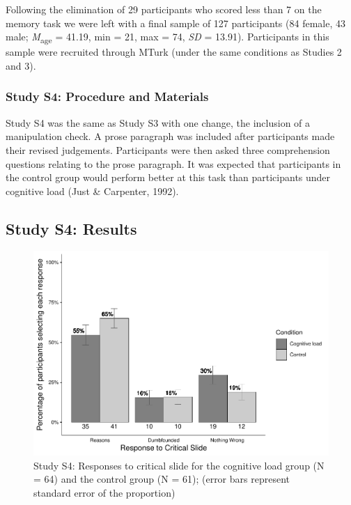 \documentclass[
  man,floatsintext]{apa6}
\begin{document}
Following the elimination of 29 participants who scored less than 7 on the memory task we were left with a final sample of 127 participants (84 female, 43 male; \emph{M}\textsubscript{age} = 41.19, min = 21, max = 74, \emph{SD} = 13.91). Participants in this sample were recruited through
MTurk (under the same conditions as Studies 2 and 3).

\hypertarget{study-s4-procedure-and-materials}{%
\subsubsection{Study S4: Procedure and Materials}\label{study-s4-procedure-and-materials}}

Study S4 was the same as Study S3 with one change, the inclusion of a manipulation check. A prose paragraph was included after participants made their revised judgements. Participants were then asked three comprehension questions relating to the prose paragraph. It was expected that participants in the control group would perform better at this task than participants under cognitive load (Just \& Carpenter, 1992).

\hypertarget{study-s4-results}{%
\subsection{Study S4: Results}\label{study-s4-results}}

\begin{figure}[!h]
\includegraphics{Supplementary_files/figure-latex/ch5S4fig2criticalcondition-1} \caption{Study S4: Responses to critical slide for the cognitive load group (N = 64) and the control group (N = 61); (error bars represent standard error of the proportion)}\label{fig:ch5S4fig2criticalcondition}
\end{figure}
\end{document}
